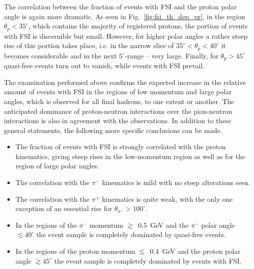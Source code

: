 The correlation between the fraction of events with FSI and the proton polar angle is again more dramatic. As seen in Fig.~\ref{fig:fsi_th_dep_pr}, in the region $\theta_{p}<35^{\circ}$, which contains the majority of registered protons, the portion of events with FSI is discernible but small. However, for higher polar angles a rather steep rise of this portion takes place, i.e. in the narrow slice of $35^{\circ}<\theta_{p}<40^{\circ}$ it becomes considerable and in the next $5^{\circ}$-range -- very large. Finally, for $\theta_{p}>45^{\circ}$ quasi-free events turn out to vanish, while events with FSI prevail.


The examination performed above confirms the expected increase in the relative amount of events with FSI in the regions of low momentum and large polar angles, which is observed for all final hadrons, to one extent or another. The anticipated dominance of proton-neutron interactions over the pion-neutron interactions is also in agreement with the observations. In addition to these general statements, the following more specific conclusions can be made.%
\begin{itemize}
\item The fraction of events with FSI is strongly correlated with the proton kinematics, giving steep rises in the low-momentum region as well as for the region of large polar angles.%
\item The correlation with the $\pi^{-}$ kinematics is mild with no steep alterations seen.%
\item The correlation with the $\pi^{+}$ kinematics is quite weak, with the only one exception of an essential rise for $\theta_{\pi^{+}}>100^{\circ}$. %
\item In the regions of the $\pi^{-}$ momentum $\gtrsim$~0.5~GeV and the $\pi^{-}$ polar angle $\lesssim 40^{\circ}$ the event sample is completely dominated by quasi-free events.%
\item In the regions of the proton momentum $\lesssim$~0.4~GeV and the proton polar angle $\gtrsim 45^{\circ}$ the event sample is completely dominated by events with FSI.%
\end{itemize}

